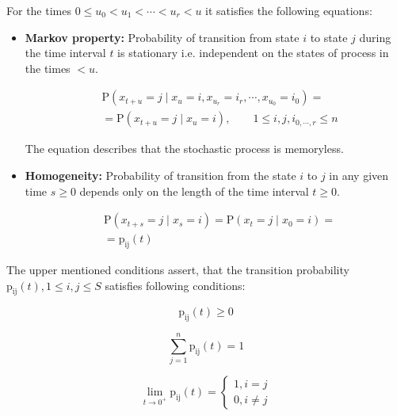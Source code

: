 \documentclass[thesis=M,english]{FITthesis}[2012/10/20]
\begin{document}
For the times $0 \leq u_0 < u_1 < \cdots < u_r < u$ it satisfies the following equations: 
\begin{itemize}
\item \textbf{Markov property:} Probability of transition from state $i$ to state $j$ during the time interval $t$ is stationary i.e. independent on the states of process in the times $< u$.  
    
\begin{equation}
\begin{aligned}
& \mathrm{P}( x_{t+u} = j \mid x_u = i, x_{u_r} = i_r, \cdots , x_{u_0} = i_0 ) = \\ 
& = \mathrm{P}( x_{t+u} = j \mid x_u = i ), \qquad 1 \leq i,j,i_{0,\cdots,r} \leq n 
\end{aligned}
\end{equation}

The equation describes that the stochastic process is memoryless.

\item \textbf{Homogeneity:} Probability of transition from the state $i$ to $j$ in any given time $s \geq 0$ depends only on the length of the time interval $t \geq 0$. 

\begin{equation}
\begin{aligned}
& \mathrm{P}( x_{t+s} = j \mid x_s = i ) = \mathrm{P}( x_t = j \mid x_0 = i ) = \\
& = \mathrm{p_{ij}}(t)
\end{aligned}
\end{equation}

\end{itemize}
 

The upper mentioned conditions assert, that the transition probability $\mathrm{p_{ij}}(t), 1 \leq i,j \leq S$ satisfies following conditions:%


\begin{equation}
\mathrm{p_{ij}}(t) \geq 0
\end{equation}

\begin{equation}
\sum_{j = 1}^n \mathrm{p_{ij}}(t) = 1
\end{equation}

\begin{equation}\label{eq:l0}  
\lim_{t \to 0^+} \mathrm{p_{ij}}(t)= 
\begin{cases}
1, i = j\\
0, i \neq j
\end{cases}
\end{equation}
\end{document}
